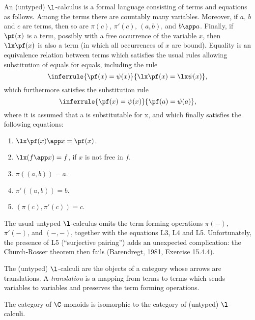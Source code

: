 \begin{defn}
An (untyped) $\l$-calculus is a formal language consisting
of terms and equations as follows. Among the terms there are countably many
variables. Moreover, if $a$, $b$ and $c$ are terms, then so are
$\pi(c)$, $\pi'(c)$, $(a,b)$, and $b \app a$.
Finally, if $\pf(x)$ is a term, possibly with a free occurrence
of the variable $x$, then $\lx\pf(x)$ is also a term (in which all occurrences of
$x$ are bound). Equality is an equivalence relation between terms which
satisfies the usual rules allowing substitution of equals for equals, including
the rule
\[
\inferrule{\pf(x) = \psi(x)}{\lx \pf(x) = \lx \psi(x)},
\]
which furthermore satisfies the substitution rule
\[
\inferrule{\pf(x) = \psi(x)}{ \pf(a) = \psi(a)},
\]
where it is assumed that a is substitutable for x, and which finally
satisfies the following equations:
\begin{enumerate}[label=L\theenumi.]
\item $\lx \pf(x)\app x = \pf(x)$.
\item $\lx (f \app x) = f$, if $x$ is not free in $f$.
\item $\pi((a,b)) = a$.
\item $\pi'((a,b)) = b$.
\item $(\pi(c), \pi' (c)) = c$.
\end{enumerate}
\end{defn}

The usual untyped $\l$-calculus omits the term forming operations $\pi(-)$,
$\pi'(-)$, and $(-,-)$, together with the equations L3, L4 and L5. Unfortunately,
the presence of L5 (``surjective pairing'') adds an unexpected complication:
the Church-Rosser theorem then fails (Barendregt, 1981, Exercise 15.4.4).

The (untyped) $\l$-calculi are the objects of a category whose arrows are
translations. A {\em translation} is a mapping from terms to terms which sends
variables to variables and preserves the term forming operations.

\begin{thm}
The category of $\C$-monoids is isomorphic to the category of
(untyped) $\l$-calculi.
\end{thm}


